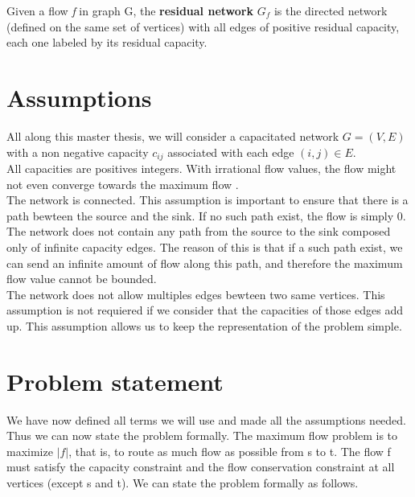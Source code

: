 \begin{definition}
\label{rnetwork}
Given a flow \textit{f} in graph G, the \textbf{residual network} $G_f$ is the directed network (defined on the same set of vertices) with all edges of positive residual capacity, each one labeled by its residual capacity.
\end{definition}


\section{Assumptions}

All along this master thesis, we will  consider a capacitated network $G = (V, E)$ with a non negative  capacity $c_{ij}$ associated with each edge $(i, j) \in E$.\\

All capacities are positives integers. With irrational flow values, the flow might not even converge towards the maximum flow \cite{Zwick1995165}.\\%

The network is connected. This assumption is important to ensure that there is a path bewteen the source and the sink. If no such path exist, the flow is simply $0$.\\

The network does not contain any path from the source to the sink composed only of infinite capacity edges. The reason of this is that if a such path exist, we can send an infinite amount of flow along this path, and therefore the maximum flow value cannot be bounded. \\

The network does not allow multiples edges bewteen two same vertices. This assumption is not requiered if we consider that the capacities of those edges add up. This assumption allows us to keep the representation of the problem simple.

\section{Problem statement}

We have now defined all terms we will use and made all the assumptions needed. Thus we can now state the problem formally. The maximum flow problem is to maximize $\left\vert{f}\right\vert$, that is, to route as much flow as possible from s to t. The flow f must satisfy the capacity constraint and the flow conservation constraint at all vertices (except s and t). We can state the problem formally as follows.

